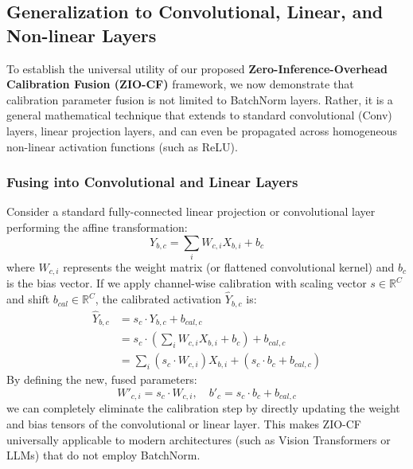 \documentclass{article}
\begin{document}
\subsection{Generalization to Convolutional, Linear, and Non-linear Layers}
To establish the universal utility of our proposed \textbf{Zero-Inference-Overhead Calibration Fusion (ZIO-CF)} framework, we now demonstrate that calibration parameter fusion is not limited to BatchNorm layers. Rather, it is a general mathematical technique that extends to standard convolutional (Conv) layers, linear projection layers, and can even be propagated across homogeneous non-linear activation functions (such as ReLU).

\subsubsection{Fusing into Convolutional and Linear Layers}
Consider a standard fully-connected linear projection or convolutional layer performing the affine transformation:
\begin{equation}
    Y_{b, c} = \sum_{i} W_{c, i} X_{b, i} + b_{c}
    \label{eq:linear_layer}
\end{equation}
where $W_{c, i}$ represents the weight matrix (or flattened convolutional kernel) and $b_c$ is the bias vector.
If we apply channel-wise calibration with scaling vector $s \in \mathbb{R}^C$ and shift $b_{cal} \in \mathbb{R}^C$, the calibrated activation $\hat{Y}_{b, c}$ is:
\begin{align}
    \hat{Y}_{b, c} &= s_c \cdot Y_{b, c} + b_{cal, c} \nonumber \\
    &= s_c \cdot \left( \sum_{i} W_{c, i} X_{b, i} + b_c \right) + b_{cal, c} \nonumber \\
    &= \sum_{i} (s_c \cdot W_{c, i}) X_{b, i} + (s_c \cdot b_c + b_{cal, c})
\end{align}
By defining the new, fused parameters:
\begin{equation}
    W'_{c, i} = s_c \cdot W_{c, i}, \quad b'_c = s_c \cdot b_c + b_{cal, c}
    \label{eq:linear_fuse}
\end{equation}
we can completely eliminate the calibration step by directly updating the weight and bias tensors of the convolutional or linear layer. This makes ZIO-CF universally applicable to modern architectures (such as Vision Transformers or LLMs) that do not employ BatchNorm.
\end{document}
